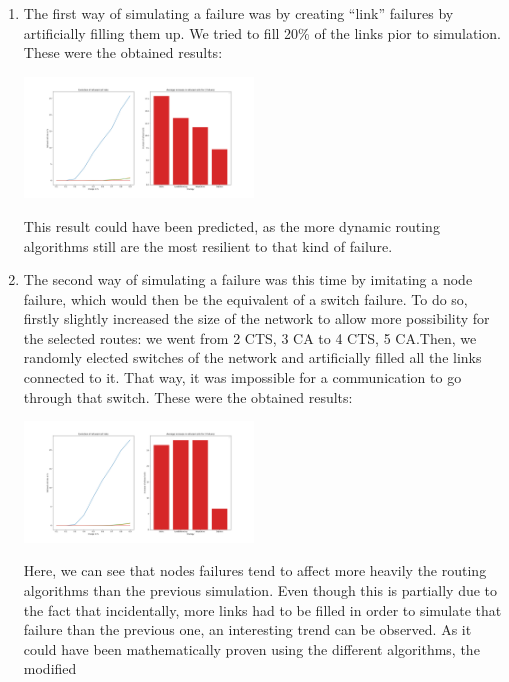 \documentclass[lettersize,journal]{IEEEtran} %
\begin{document}
\begin{enumerate}
        \item The first way of simulating a failure was by creating ``link'' failures by artificially filling them up. We tried to fill
        20\% of the links pior to simulation. These were the obtained results:
        \begin{center}
                \includegraphics[width=0.48\textwidth]{link_failures.png}       
        \end{center}
        This result could have been predicted, as the more dynamic routing algorithms still are the most resilient to that kind of failure.
        \item The second way of simulating a failure was this time by imitating a node failure, which would then be the equivalent of a 
        switch failure. To do so, firstly slightly increased the size of the network to allow more possibility for the selected routes:
        we went from 2 CTS, 3 CA to 4 CTS, 5 CA.Then, we randomly elected switches of the network and artificially filled all the links
        connected to it. That way, it was impossible for a communication to go through that switch. These were the obtained results:
        \begin{center}
                \includegraphics[width=0.48\textwidth]{node_failures.png}       
        \end{center}
        Here, we can see that nodes failures tend to affect more heavily the routing algorithms than the previous simulation. Even though
        this is partially due to the fact that incidentally, more links had to be filled in order to simulate that failure than the previous
        one, an interesting trend can be observed. As it could have been mathematically proven using the different algorithms, the modified

\end{enumerate}
\end{document}
